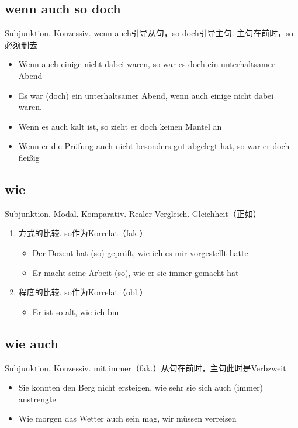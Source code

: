 \documentclass[UTF8]{report}
\begin{document}
\subsection{wenn auch so doch}
Subjunktion. Konzessiv. wenn auch引导从句，so doch引导主句. 主句在前时，so必须删去
\begin{itemize}
    \item Wenn auch einige nicht dabei waren, so war es doch ein unterhaltsamer Abend
    \item Es war (doch) ein unterhaltsamer Abend, wenn auch einige nicht dabei waren.
    \item Wenn es auch kalt ist, so zieht er doch keinen Mantel an
    \item Wenn er die Prüfung auch nicht besonders gut abgelegt hat, so war er doch fleißig
\end{itemize}


\subsection{wie}
Subjunktion. Modal. Komparativ. Realer Vergleich. Gleichheit（正如）
\begin{enumerate}
    \item 方式的比较. so作为Korrelat（fak.）
    \begin{itemize}
        \item Der Dozent hat (so) geprüft, wie ich es mir vorgestellt hatte
        \item Er macht seine Arbeit (so), wie er sie immer gemacht hat
    \end{itemize}
    \item 程度的比较. so作为Korrelat（obl.）
    \begin{itemize}
        \item Er ist so alt, wie ich bin
    \end{itemize}
\end{enumerate}

\subsection{wie auch}
Subjunktion. Konzessiv. mit immer（fak.）从句在前时，主句此时是Verbzweit
\begin{itemize}
    \item Sie konnten den Berg nicht ersteigen, wie sehr sie sich auch (immer) anstrengte
    \item Wie morgen das Wetter auch sein mag, wir müssen verreisen
\end{itemize}
\end{document}
